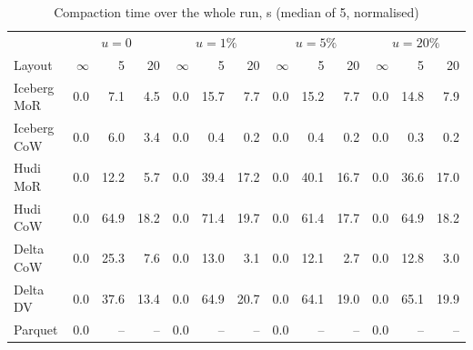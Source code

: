 \begin{table}[!t]\centering
\caption{Compaction time over the whole run, s (median of 5, normalised)}\label{tab:a-compact}
\footnotesize
\begin{tabular}{@{}lrrrrrrrrrrrr@{}}\toprule
 & \multicolumn{3}{c}{$u=0$} & \multicolumn{3}{c}{$u=1\%$} & \multicolumn{3}{c}{$u=5\%$} & \multicolumn{3}{c}{$u=20\%$}\\
\cmidrule(lr){2-4}\cmidrule(lr){5-7}\cmidrule(lr){8-10}\cmidrule(lr){11-13}
Layout & $\infty$ & 5 & 20 & $\infty$ & 5 & 20 & $\infty$ & 5 & 20 & $\infty$ & 5 & 20\\\midrule
Iceberg MoR & 0.0 & 7.1 & 4.5 & 0.0 & 15.7 & 7.7 & 0.0 & 15.2 & 7.7 & 0.0 & 14.8 & 7.9\\
Iceberg CoW & 0.0 & 6.0 & 3.4 & 0.0 & 0.4 & 0.2 & 0.0 & 0.4 & 0.2 & 0.0 & 0.3 & 0.2\\
Hudi MoR & 0.0 & 12.2 & 5.7 & 0.0 & 39.4 & 17.2 & 0.0 & 40.1 & 16.7 & 0.0 & 36.6 & 17.0\\
Hudi CoW & 0.0 & 64.9 & 18.2 & 0.0 & 71.4 & 19.7 & 0.0 & 61.4 & 17.7 & 0.0 & 64.9 & 18.2\\
Delta CoW & 0.0 & 25.3 & 7.6 & 0.0 & 13.0 & 3.1 & 0.0 & 12.1 & 2.7 & 0.0 & 12.8 & 3.0\\
Delta DV & 0.0 & 37.6 & 13.4 & 0.0 & 64.9 & 20.7 & 0.0 & 64.1 & 19.0 & 0.0 & 65.1 & 19.9\\
Parquet & 0.0 & -- & -- & 0.0 & -- & -- & 0.0 & -- & -- & 0.0 & -- & --\\\bottomrule
\end{tabular}
\end{table}

